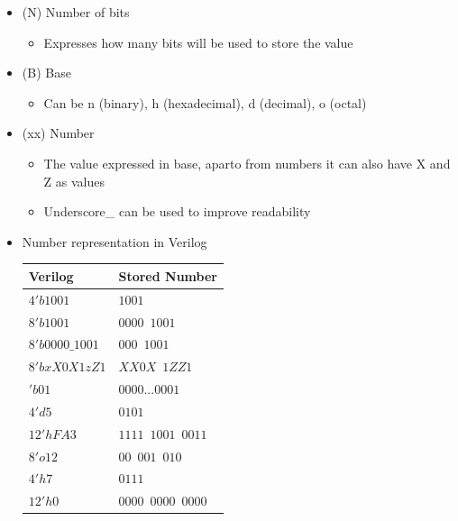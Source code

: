 \documentclass[a4paper]{article}
\begin{document}
\begin{itemize}
	\begin{itemize}
		\item \color{red}(N) Number of bits\color{black}
			\begin{itemize}
				\item Expresses how many bits will be used to store the value
			\end{itemize}
		\item \color{blue}(B) Base\color{black}
			\begin{itemize}
				\item Can be n (binary), h (hexadecimal), d (decimal), o (octal)
			\end{itemize}
		\item \color{green}(xx) Number\color{black}
			\begin{itemize}
				\item The value expressed in base, aparto from numbers it can also have X and Z as values
				\item Underscore\_ can be used to improve readability
			\end{itemize}	
	\end{itemize}
	\end{itemize}
\begin{itemize}
\item Number representation in Verilog\\
	\begin{tabular}{l|l}
	Verilog&Stored Number\\\hline
	$4'b1001$&$1001$\\
	$8'b1001$&$0000\enspace1001$\\
	$8'b0000\_1001$&$000\enspace1001$\\
	$8'bxX0X1zZ1$&$XX0X\enspace1ZZ1$\\
	$'b01$&$0000...0001$\\
	$4'd5$&$0101$\\
	$12'hFA3$&$1111\enspace1001\enspace0011$\\
	$8'o12$&$00\enspace001\enspace010$\\
	$4'h7$&$0111$\\
	$12'h0$&$0000\enspace0000\enspace0000$\\
	\end{tabular}
\end{itemize}
\end{document}
